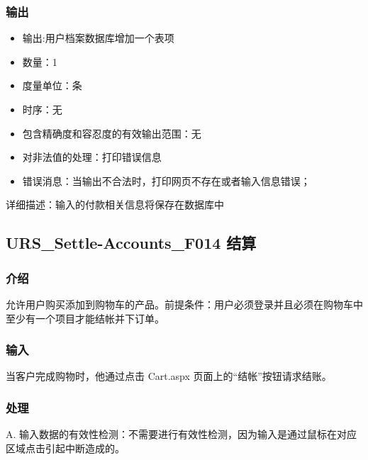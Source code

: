 		 \subsubsection{输出}
		 \begin{itemize}
			 \item	输出:用户档案数据库增加一个表项
			 \item	数量：1
			 \item	度量单位：条
			 \item	时序：无
			 \item	包含精确度和容忍度的有效输出范围：无
			 \item	对非法值的处理：打印错误信息
			 \item	错误消息：当输出不合法时，打印网页不存在或者输入信息错误；
			\end{itemize}
			详细描述：输入的付款相关信息将保存在数据库中


			\subsection{URS\_Settle-Accounts\_F014 结算}
			\subsubsection{介绍}
			允许用户购买添加到购物车的产品。前提条件：用户必须登录并且必须在购物车中至少有一个项目才能结帐并下订单。

			\subsubsection{输入}
			
			当客户完成购物时，他通过点击 Cart.aspx 页面上的“结帐”按钮请求结账。
		 
		 
			\subsubsection{处理}
			
			
			
			A. 输入数据的有效性检测：不需要进行有效性检测，因为输入是通过鼠标在对应区域点击引起中断造成的。
			
